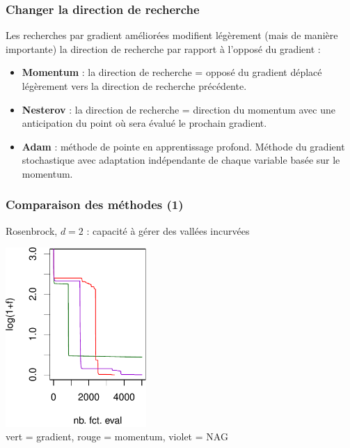 \documentclass[12pt]{beamer}
\begin{document}
\begin{frame}
\frametitle{Changer la direction de recherche} 
Les recherches par gradient améliorées modifient légèrement (mais de manière importante) la direction de recherche par rapport à l’opposé du gradient :
\begin{itemize}
\item \textbf{Momentum} : la direction de recherche = opposé du gradient déplacé légèrement vers la direction de recherche précédente.
\item \textbf{Nesterov} \cite{nesterov1983method} : la direction de recherche = direction du momentum avec une anticipation du point où sera évalué le prochain gradient.
\item \textbf{Adam} \cite{kingma2014adam} : méthode de pointe en apprentissage profond. Méthode du gradient stochastique avec adaptation indépendante de chaque variable basée sur le momentum.
\end{itemize}
\end{frame}

\begin{frame}
\frametitle{Comparaison des méthodes (1)} 
Rosenbrock, $d=2$ : capacité à gérer des vallées incurvées
\begin{center}
\includegraphics[width=0.4\textwidth]{rosen_comparison-crop.pdf} \\
vert = gradient, rouge = momentum, violet = NAG
\end{center}
\end{frame}
\end{document}
